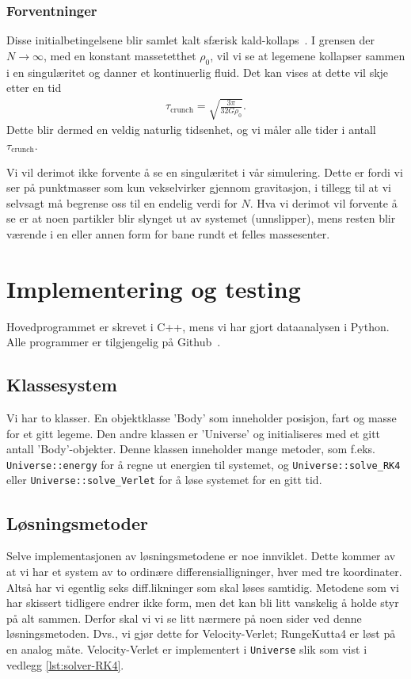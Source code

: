 \documentclass[11pt]{article}
\begin{document}
\begin{multicols}{2}
\subsubsection{Forventninger}
Disse initialbetingelsene blir samlet kalt sfærisk
kald-kollaps~\cite{cold-collapse}. I grensen der $N\rightarrow\infty$,
med en konstant massetetthet $\rho_0$, vil vi se at legemene kollapser
sammen i en singulæritet og danner et kontinuerlig fluid. Det kan
vises at dette vil skje etter en tid~\cite{project5-exercise}
\begin{align}
  \tau_\text{crunch} = \sqrt{\frac{ 3\pi }{ 32G\rho_0 }}\label{eq:t-crunch}.
\end{align}
Dette blir dermed en veldig naturlig tidsenhet, og vi måler alle tider
i antall $\tau_\text{crunch}$. 

Vi vil derimot ikke forvente å se en singulæritet i vår
simulering. Dette er fordi vi ser på punktmasser som kun vekselvirker
gjennom gravitasjon, i tillegg til at vi selvsagt må begrense oss til
en endelig verdi for $N$. Hva vi derimot vil forvente å se er at noen
partikler blir slynget ut av systemet (unnslipper), mens resten blir
værende i en eller annen form for bane rundt et felles massesenter. 

\section{Implementering og testing}
Hovedprogrammet er skrevet i C++, mens vi har gjort dataanalysen i Python.
Alle programmer er tilgjengelig på Github~\cite{github-repo}. 

\subsection{Klassesystem}
Vi har to klasser. En objektklasse 'Body' som inneholder posisjon, fart 
og masse for et gitt legeme. Den andre klassen er 'Universe' og initialiseres
med et gitt antall 'Body'-objekter. Denne klassen inneholder mange metoder,
som f.eks. \texttt{Universe::energy} for å regne ut energien til systemet, og 
\texttt{Universe::solve\_RK4} eller \texttt{Universe::solve\_Verlet} for å løse systemet
for en gitt tid.

\subsection{Løsningsmetoder}
Selve implementasjonen av løsningsmetodene er noe innviklet. Dette
kommer av at vi har et system av to ordinære differensialligninger,
hver med tre koordinater. Altså har vi egentlig seks diff.likninger
som skal løses samtidig. Metodene som vi har skissert tidligere endrer
ikke form, men det kan bli litt vanskelig å holde styr på alt
sammen. Derfor skal vi vi se litt nærmere på noen sider ved denne løsningsmetoden.
 Dvs., vi gjør dette for Velocity-Verlet;
RungeKutta4 er løst på en analog måte. Velocity-Verlet er implementert i
\texttt{Universe} slik som vist i vedlegg \ref{lst:solver-RK4}. 


\end{multicols}
\end{document}
